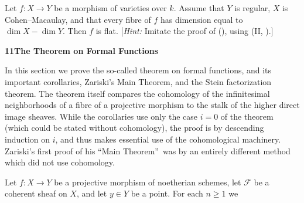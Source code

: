 { Let $f\colon X\to Y$ be a morphism of varieties over $k$. Assume that $Y$ is regular, $X$ is Cohen--Macaulay, and that every fibre of $f$ has dimension equal to $\dim X-\dim Y$. Then $f$ is flat. [\emph{Hint:} Imitate the proof of (), using (II, ).]

\par\medskip\noindent\hypertarget{sec-III-11}{}{\large\bfseries 11\enspace The Theorem on Formal Functions}\par\medskip
\noindent In this section we prove the so-called theorem on formal functions, and its important corollaries, Zariski's Main Theorem, and the Stein factorization theorem. The theorem itself compares the cohomology of the infinitesimal neighborhoods of a fibre of a projective morphism to the stalk of the higher direct image sheaves. While the corollaries use only the case $i=0$ of the theorem (which could be stated without cohomology), the proof is by descending induction on $i$, and thus makes essential use of the cohomological machinery. Zariski's first proof  of his \textquotedblleft Main Theorem\textquotedblright\ was by an entirely different method which did not use cohomology.

Let $f\colon X\to Y$ be a projective morphism of noetherian schemes, let $\mathcal F$ be a coherent sheaf on $X$, and let $y\in Y$ be a point. For each $n\geqslant1$ we
}
